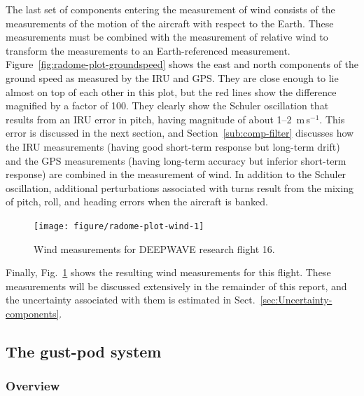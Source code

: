 \documentclass[12pt,twoside,english]{article}\usepackage[]{graphicx}\usepackage[]{color}
\newenvironment{knitrout}{}{} %
\let\OrgIndex\index
\renewcommand*{\index}[1]{\OrgIndex{#1}}
\begin{document}
The last set of components entering the measurement of wind consists of the measurements of the motion of the aircraft with respect to the Earth. These measurements must be combined with the measurement of relative wind to transform the measurements to an Earth-referenced measurement. Figure~\ref{fig:radome-plot-groundspeed} shows the east and north components of the ground speed as measured by the IRU and GPS. They are close enough to lie almost on top of each other in this plot, but the red lines show the difference magnified by a factor of 100. They clearly show the Schuler oscillation that results from an IRU error in pitch, having magnitude of about 1--2~m\,s$^{-1}$. This error is discussed in the next section, and Section~\ref{sub:comp-filter} discusses how the IRU measurements (having good short-term response but long-term drift) and the GPS measurements (having long-term accuracy but inferior short-term response) are combined in the measurement of wind. In addition to the Schuler oscillation, additional perturbations associated with turns result from the mixing of pitch, roll, and heading errors when the aircraft is banked. 

\begin{knitrout}
\color{fgcolor}\begin{figure}
\texttt{[image: figure/radome-plot-wind-1]} \caption[Wind measurements for DEEPWAVE research flight 16]{Wind measurements for DEEPWAVE research flight 16.}\label{fig:radome-plot-wind}
\end{figure}


\end{knitrout}

Finally, Fig.~\ref{fig:radome-plot-wind}  shows the resulting wind measurements for this flight. These measurements will be discussed extensively in the remainder of this report, and the uncertainty associated with them is estimated in Sect.~\ref{sec:Uncertainty-components}. 

\subsection{The gust-pod system\label{sub:The-gust-pod-system}}


\subsubsection{Overview}
\end{document}
